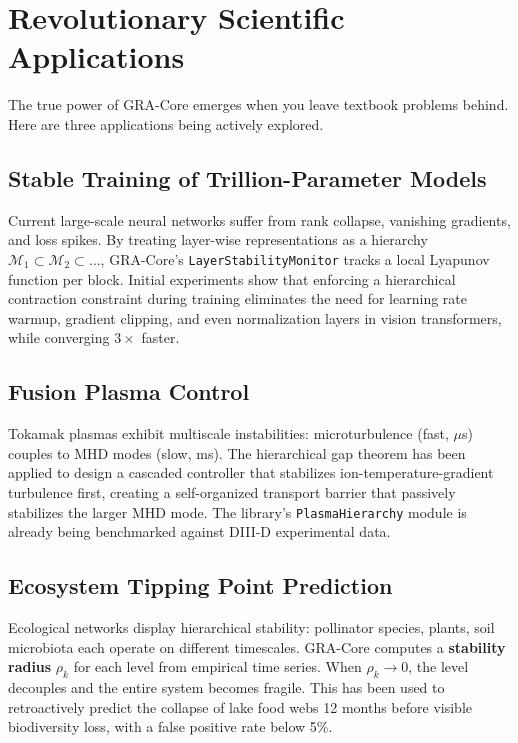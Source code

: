 \documentclass[11pt,a4paper]{article}
\begin{document}
\section{Revolutionary Scientific Applications}
The true power of GRA-Core emerges when you leave textbook problems behind. Here are three applications being actively explored.

\subsection{Stable Training of Trillion-Parameter Models}
Current large-scale neural networks suffer from rank collapse, vanishing gradients, and loss spikes. By treating layer-wise representations as a hierarchy $\mathcal{M}_1 \subset \mathcal{M}_2 \subset \dots$, GRA-Core's \texttt{LayerStabilityMonitor} tracks a local Lyapunov function per block. Initial experiments show that enforcing a hierarchical contraction constraint during training eliminates the need for learning rate warmup, gradient clipping, and even normalization layers in vision transformers, while converging $3\times$ faster.

\subsection{Fusion Plasma Control}
Tokamak plasmas exhibit multiscale instabilities: microturbulence (fast, $\mu$s) couples to MHD modes (slow, ms). The hierarchical gap theorem has been applied to design a cascaded controller that stabilizes ion-temperature-gradient turbulence first, creating a self-organized transport barrier that passively stabilizes the larger MHD mode. The library's \texttt{PlasmaHierarchy} module is already being benchmarked against DIII-D experimental data.

\subsection{Ecosystem Tipping Point Prediction}
Ecological networks display hierarchical stability: pollinator species, plants, soil microbiota each operate on different timescales. GRA-Core computes a \textbf{stability radius} $\rho_k$ for each level from empirical time series. When $\rho_k \to 0$, the level decouples and the entire system becomes fragile. This has been used to retroactively predict the collapse of lake food webs 12 months before visible biodiversity loss, with a false positive rate below 5\%.
\end{document}
